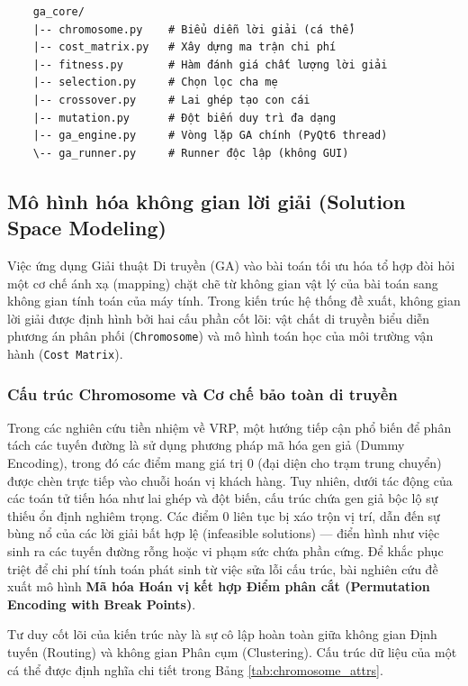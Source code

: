 \documentclass[12pt,a4paper]{article}
\numberwithin{figure}{subsection}
\numberwithin{table}{subsection}
\newcounter{codecounter}
\newenvironment{codeblock}[2]{%
    \refstepcounter{codecounter}%
    \phantomsection%
    \label{#1}%
    \par\smallskip
}{%
    \par\smallskip
}
\begin{document}
\begin{codeblock}{app:code:structure}{Cấu trúc module hệ thống}
\begin{verbatim}
    ga_core/
    |-- chromosome.py    # Biểu diễn lời giải (cá thể)
    |-- cost_matrix.py   # Xây dựng ma trận chi phí
    |-- fitness.py       # Hàm đánh giá chất lượng lời giải
    |-- selection.py     # Chọn lọc cha mẹ
    |-- crossover.py     # Lai ghép tạo con cái
    |-- mutation.py      # Đột biến duy trì đa dạng
    |-- ga_engine.py     # Vòng lặp GA chính (PyQt6 thread)
    \-- ga_runner.py     # Runner độc lập (không GUI)
\end{verbatim}
\end{codeblock}

\subsection{Mô hình hóa không gian lời giải (Solution Space Modeling)}

Việc ứng dụng Giải thuật Di truyền (GA) vào bài toán tối ưu hóa tổ hợp đòi hỏi một cơ chế ánh xạ (mapping) chặt chẽ từ không gian vật lý của bài toán sang không gian tính toán của máy tính. Trong kiến trúc hệ thống đề xuất, không gian lời giải được định hình bởi hai cấu phần cốt lõi: vật chất di truyền biểu diễn phương án phân phối (\texttt{Chromosome}) và mô hình toán học của môi trường vận hành (\texttt{Cost Matrix}).

\subsubsection{Cấu trúc Chromosome và Cơ chế bảo toàn di truyền}

Trong các nghiên cứu tiền nhiệm về VRP, một hướng tiếp cận phổ biến để phân tách các tuyến đường là sử dụng phương pháp mã hóa gen giả (Dummy Encoding), trong đó các điểm mang giá trị $0$ (đại diện cho trạm trung chuyển) được chèn trực tiếp vào chuỗi hoán vị khách hàng. Tuy nhiên, dưới tác động của các toán tử tiến hóa như lai ghép và đột biến, cấu trúc chứa gen giả bộc lộ sự thiếu ổn định nghiêm trọng. Các điểm $0$ liên tục bị xáo trộn vị trí, dẫn đến sự bùng nổ của các lời giải bất hợp lệ (infeasible solutions) — điển hình như việc sinh ra các tuyến đường rỗng hoặc vi phạm sức chứa phần cứng. Để khắc phục triệt để chi phí tính toán phát sinh từ việc sửa lỗi cấu trúc, bài nghiên cứu đề xuất mô hình \textbf{Mã hóa Hoán vị kết hợp Điểm phân cắt (Permutation Encoding with Break Points)}. 

Tư duy cốt lõi của kiến trúc này là sự cô lập hoàn toàn giữa không gian Định tuyến (Routing) và không gian Phân cụm (Clustering). Cấu trúc dữ liệu của một cá thể được định nghĩa chi tiết trong Bảng \ref{tab:chromosome_attrs}.
\end{document}
